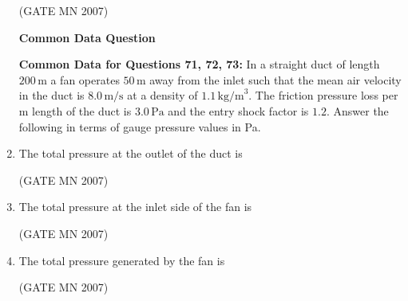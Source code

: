 \documentclass[journal]{IEEEtran}
\begin{document}
\begin{enumerate}
\hfill (GATE MN 2007)

\begin{center}
	\textbf{Common Data Question}
\end{center}

\textbf{Common Data for Questions 71, 72, 73:}  
In a straight duct of length $200 \, \text{m}$ a fan operates $50 \, \text{m}$ away from the inlet such that the mean air velocity in the duct is $8.0 \, \text{m/s}$ at a density of $1.1 \, \text{kg/m}^3$. The friction pressure loss per m length of the duct is $3.0 \, \text{Pa}$ and the entry shock factor is $1.2$. Answer the following in terms of gauge pressure values in Pa.

    \item The total pressure at the outlet of the duct is  
	    \begin{enumerate}
    \end{enumerate}

    \hfill (GATE MN 2007)

    \item The total pressure at the inlet side of the fan is  
    \begin{enumerate}
    \end{enumerate}
    \hfill (GATE MN 2007)

    \item The total pressure generated by the fan is  
    \begin{enumerate}
    \end{enumerate}
    \hfill (GATE MN 2007)



\end{enumerate}
\end{document}
